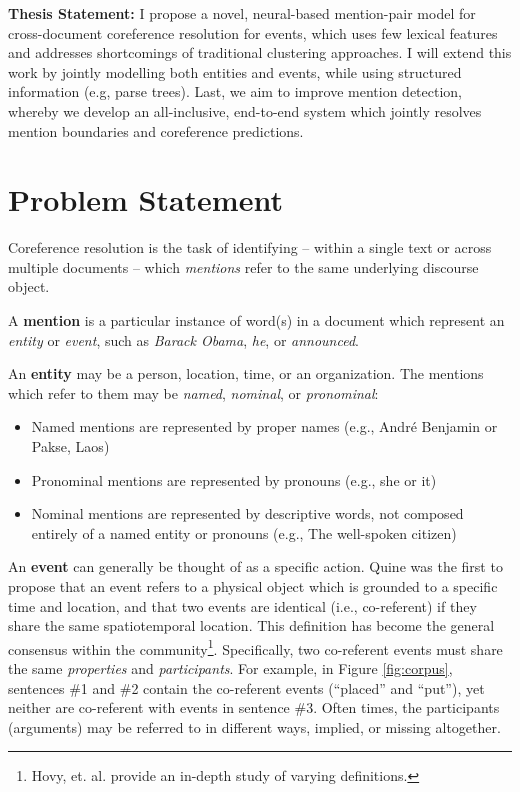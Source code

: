 
\textbf{Thesis Statement:} I propose a novel, neural-based mention-pair model for cross-document coreference resolution for events, which uses few lexical features and addresses shortcomings of traditional clustering approaches.  I will extend this work by jointly modelling both entities and events, while using structured information (e.g, parse trees).  Last, we aim to improve mention detection, whereby we develop an all-inclusive, end-to-end system which jointly resolves mention boundaries and coreference predictions.

\vspace{10mm}

\section{Problem Statement}
Coreference resolution is the task of identifying -- within a single text or across multiple documents -- which \textit{mentions} refer to the same underlying discourse object. 

A \textbf{mention} is a particular instance of word(s) in a document which represent an \textit{entity} or \textit{event}, such as \textit{Barack Obama}, \textit{he}, or \textit{announced}.

An \textbf{entity} may be a person, location, time, or an organization.  The mentions which refer to them may be \textit{named}, \textit{nominal}, or \textit{pronominal}:
\begin{itemize}
\item Named mentions are represented by proper names (e.g., Andr\'e Benjamin or Pakse, Laos) 
\item Pronominal mentions are represented by pronouns (e.g., she or it)
\item Nominal mentions are represented by descriptive words, not composed entirely of a named entity or pronouns (e.g., The well-spoken citizen)
\end{itemize}

An \textbf{event} can generally be thought of as a specific action.  Quine \cite{quine1985} was the first to propose that an event refers to a physical object which is grounded to a specific time and location, and that two events are identical (i.e., co-referent) if they share the same spatiotemporal location.  This definition has become the general consensus within the community\footnote{Hovy, et. al. \cite{Hovy2013EventsAN} provide an in-depth study of varying definitions.}.  Specifically, two co-referent events must share the same \textit{properties} and \textit{participants}.  For example, in Figure \ref{fig:corpus}, sentences \#1 and \#2 contain the co-referent events (``placed'' and ``put''), yet neither are co-referent with events in sentence \#3.  Often times, the participants (arguments) may be referred to in different ways, implied, or missing altogether.

